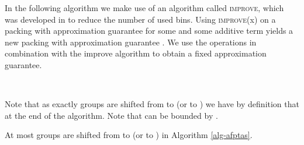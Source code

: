 In the following algorithm we make use of an algorithm called \textsc{improve}, which was developed in \cite{jansen2013binpacking} to reduce the number of used bins. Using \textsc{improve}(x) on a packing  with approximation guarantee  for some  and some additive term  yields a new packing  with approximation guarantee . We use the operations in combination with the improve algorithm to obtain a fixed approximation guarantee. 




\begin{algo} \label{alg-afptas}
  \ 
  \begin{small}
    

    \begin{algorithm}[H]
\end{algorithm}
  \end{small}
  \begin{small}
    

\begin{algorithm}[H]
    \end{algorithm}
  \end{small}    
\end{algo}
Note that as exactly  groups are shifted from  to  (or  to ) we have by definition that  at the end of the algorithm. Note that  can be bounded by .

\begin{lemma}
\label{lem:disbounded}
At most  groups are shifted from  to  (or  to ) in Algorithm \ref{alg-afptas}.
\end{lemma}

